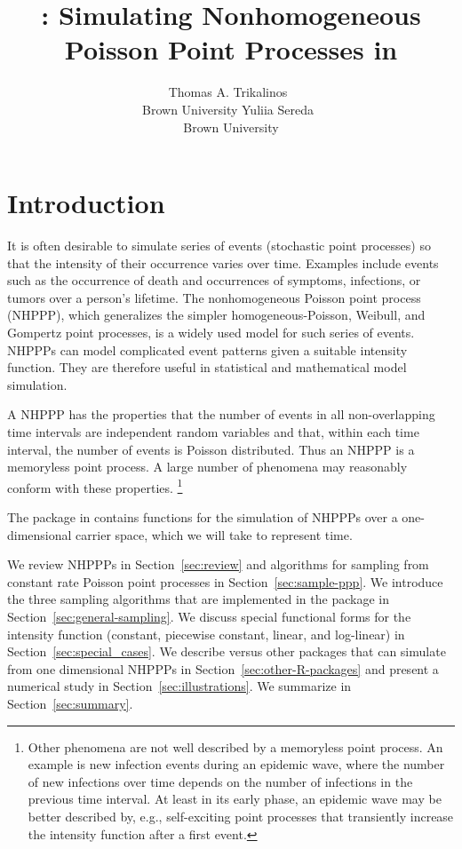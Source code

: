 \documentclass[article]{jss}\usepackage[]{graphicx}\usepackage[]{xcolor}
\author{Thomas A. Trikalinos~\orcidlink{0000-0002-3990-1848}\\Brown University
   \And Yuliia Sereda~\orcidlink{https://orcid.org/0000-0002-4017-4561}\\Brown University}
\title{\pkg{nhppp}: Simulating Nonhomogeneous Poisson Point Processes in \proglang{R}}
\begin{document}
\section{Introduction} \label{sec:intro}

It is often desirable to simulate series of events (stochastic point processes) so that the intensity of their occurrence varies over time. Examples include events such as the occurrence of death and occurrences of symptoms, infections, or tumors over a person's lifetime. The nonhomogeneous Poisson point process (NHPPP), which generalizes the simpler homogeneous-Poisson, Weibull, and Gompertz point processes, is a widely used model for such series of events. NHPPPs can model complicated event patterns given a suitable intensity function. They are therefore useful in statistical and mathematical model simulation.

A NHPPP has the properties that the number of events in all non-overlapping time intervals are independent random variables and that, within each time interval, the number of events is Poisson distributed. Thus an NHPPP is a memoryless point process. A large number of phenomena may reasonably conform with these properties.%
\footnote{Other phenomena are not well described by a memoryless point process. An example is new infection events during an epidemic wave, where the number of new infections over time depends on the number of infections in the previous time interval. At least in its early phase, an epidemic wave may be better described by, e.g., self-exciting point processes that transiently increase the intensity function after a first event.}

The  package in  contains functions for the simulation of NHPPPs over a one-dimensional carrier space, which we will take to represent time.

We review NHPPPs in Section~\ref{sec:review} and algorithms for sampling from constant rate Poisson point processes in Section~\ref{sec:sample-ppp}. We introduce the three sampling algorithms that are implemented in the package in Section~\ref{sec:general-sampling}. We discuss special functional forms for the intensity function (constant, piecewise constant, linear, and log-linear) in Section~\ref{sec:special_cases}. We describe  versus other  packages that can simulate from one dimensional NHPPPs in Section~\ref{sec:other-R-packages} and present a numerical study in Section~\ref{sec:illustrations}. We summarize in Section~\ref{sec:summary}.
\end{document}
